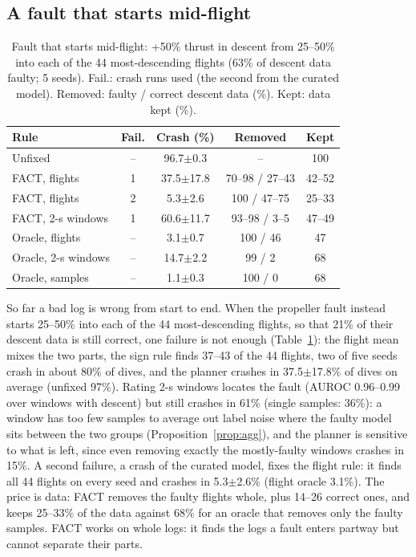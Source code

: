 \documentclass[preprint,12pt]{elsarticle}
\newcommand{\method}{FACT}
\newcommand{\pmse}[2]{#1{\scriptsize$\pm$#2}}
\begin{document}
\subsection{A fault that starts mid-flight}\label{sec:local}

\begin{table}[t]
\caption{Fault that starts mid-flight: +50\% thrust in descent from 25--50\% into each of the 44 most-descending flights (63\% of descent data faulty; 5 seeds). Fail.: crash runs used (the second from the curated model). Removed: faulty / correct descent data (\%). Kept: data kept (\%).}
\label{tab:local}
\centering\footnotesize
\setlength{\tabcolsep}{3pt}
\begin{tabular}{@{}lcccc@{}}
\toprule
Rule & Fail. & Crash (\%) & Removed & Kept \\
\midrule
Unfixed & -- & 96.7$\pm$0.3 & -- & 100 \\
\method{}, flights & 1 & 37.5$\pm$17.8 & 70--98 / 27--43 & 42--52 \\
\method{}, flights & 2 & 5.3$\pm$2.6 & 100 / 47--75 & 25--33 \\
\method{}, 2-s windows & 1 & 60.6$\pm$11.7 & 93--98 / 3--5 & 47--49 \\
Oracle, flights & -- & 3.1$\pm$0.7 & 100 / 46 & 47 \\
Oracle, 2-s windows & -- & 14.7$\pm$2.2 & 99 / 2 & 68 \\
Oracle, samples & -- & 1.1$\pm$0.3 & 100 / 0 & 68 \\
\bottomrule
\end{tabular}
\end{table}

So far a bad log is wrong from start to end. When the propeller fault instead starts 25--50\% into each of the 44 most-descending flights, so that 21\% of their descent data is still correct, one failure is not enough (Table~\ref{tab:local}): the flight mean mixes the two parts, the sign rule finds 37--43 of the 44 flights, two of five seeds crash in about 80\% of dives, and the planner crashes in \pmse{37.5}{17.8}\% of dives on average (unfixed 97\%). Rating 2-s windows locates the fault (AUROC 0.96--0.99 over windows with descent) but still crashes in 61\% (single samples: 36\%): a window has too few samples to average out label noise where the faulty model sits between the two groups (Proposition~\ref{prop:agg}), and the planner is sensitive to what is left, since even removing exactly the mostly-faulty windows crashes in 15\%. A second failure, a crash of the curated model, fixes the flight rule: it finds all 44 flights on every seed and crashes in \pmse{5.3}{2.6}\% (flight oracle 3.1\%). The price is data: \method{} removes the faulty flights whole, plus 14--26 correct ones, and keeps 25--33\% of the data against 68\% for an oracle that removes only the faulty samples. \method{} works on whole logs: it finds the logs a fault enters partway but cannot separate their parts.
\end{document}
